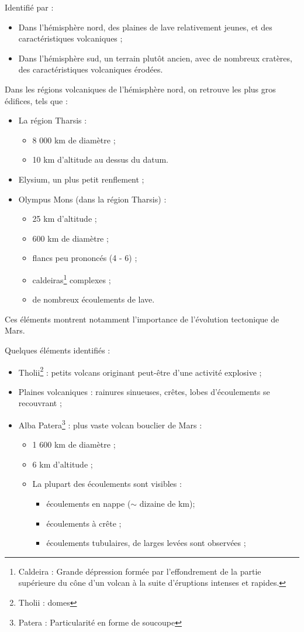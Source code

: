 \documentclass[10pt,a4paper, twocolumns]{article}
\begin{document}
	Identifié par :
	\begin{itemize}
		\item Dans l'hémisphère nord, des plaines de lave relativement jeunes, et des caractéristiques volcaniques ;
		\item Dans l'hémisphère sud, un terrain plutôt ancien, avec de nombreux cratères, des caractéristiques volcaniques érodées.
	\end{itemize}
	
	Dans les régions volcaniques de l'hémisphère nord, on retrouve les plus gros édifices, tels que :
	\begin{itemize}
		\item La région Tharsis :
		\begin{itemize}
			\item 8 000 km de diamètre ;
			\item 10 km d'altitude au dessus du datum.
		\end{itemize}
		\item Elysium, un plus petit renflement ;
		\item Olympus Mons (dans la région Tharsis) :
		\begin{itemize}
			\item 25 km d'altitude ;
			\item 600 km  de diamètre ;
			\item flancs peu prononcés (4 - 6\degree ) ;
			\item caldeiras\footnote{Caldeira : Grande dépression formée par l'effondrement de la partie supérieure du cône d'un volcan à la suite d'éruptions intenses et rapides.} complexes ;
			\item de nombreux écoulements de lave.
		\end{itemize}
	\end{itemize}
	Ces éléments montrent notamment l'importance de l'évolution tectonique de Mars.
	
	Quelques éléments identifiés :
	\begin{itemize}
		\item Tholii\footnote{Tholii : domes} : petits volcans originant peut-être d'une activité explosive ;
		\item Plaines volcaniques : rainures sinueuses, crêtes, lobes d'écoulements se recouvrant ;
		\item Alba Patera\footnote{Patera : Particularité en forme de soucoupe} : plus vaste volcan bouclier de Mars :
		\begin{itemize}
			\item 1 600 km de diamètre ;
			\item 6 km d'altitude ;
			\item La plupart des écoulements sont visibles :
			\begin{itemize}
				\item écoulements en nappe ($\sim$ dizaine de km);
				\item écoulements à crête ;
				\item écoulements tubulaires, de larges levées sont observées ;
			\end{itemize}
		\end{itemize}
	\end{itemize}
\end{document}
